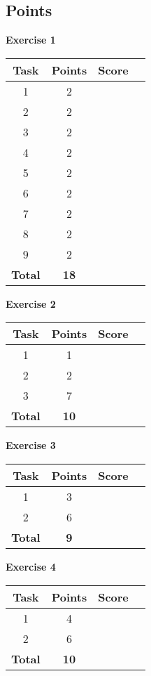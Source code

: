 \documentclass [11pt, a4wide, twoside]{article}
\begin{document}
\subsection*{Points}

\begin{minipage}[t]{120pt}
\textbf{Exercise 1}
\vspace{5pt}\\
\begin{tabular}{|c|c|c|c|}
\hline
Task & Points & Score \\\hline
1  & 2 & \\\hline
2  & 2 & \\\hline
3  & 2 & \\\hline
4  & 2 & \\\hline
5  & 2 & \\\hline
6  & 2 & \\\hline
7  & 2 & \\\hline
8  & 2 & \\\hline
9  & 2 & \\\hline
\textbf{Total} & \textbf{18} &\\\hline\hline
\end{tabular}
\end{minipage}
\begin{minipage}[t]{120pt}


\textbf{Exercise 2}
\vspace{5pt}\\
\begin{tabular}{|c|c|c|c|}
\hline
Task & Points & Score \\\hline
1 & 1 & \\\hline
2 & 2 & \\\hline
3 & 7 & \\\hline
\textbf{Total} & \textbf{10} &\\\hline\hline
\end{tabular}
\end{minipage}
\begin{minipage}[t]{120pt}


\textbf{Exercise 3}
\vspace{5pt}\\
\begin{tabular}{|c|c|c|c|}
\hline
Task & Points & Score \\\hline
1 & 3 & \\\hline
2 & 6 & \\\hline
\textbf{Total} & \textbf{9} &\\\hline\hline
\end{tabular}
\end{minipage}
\begin{minipage}[t]{120pt}


\textbf{Exercise 4}
\vspace{5pt}\\
\begin{tabular}{|c|c|c|c|}
\hline
Task & Points & Score \\\hline
1 & 4 & \\\hline
2 & 6 & \\\hline
\textbf{Total} & \textbf{10} &\\\hline\hline
\end{tabular}
\end{minipage}
\end{document}
